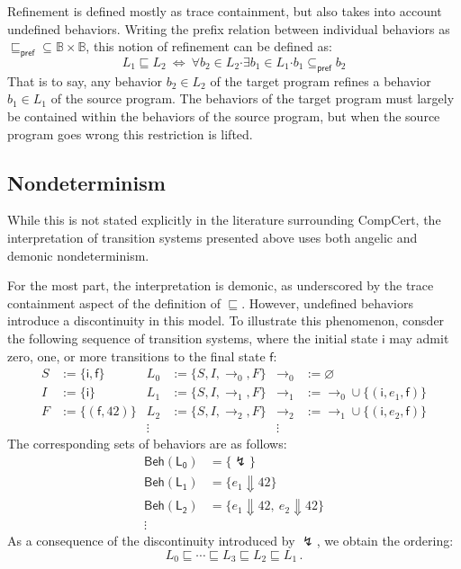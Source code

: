 \documentclass[draft,11pt]{report}
\theoremstyle{definition}
\newcommand{\kw}[1]{\ensuremath{ \mathsf{#1} }}
\newcommand{\bdot}{\boldsymbol{\cdot}}
\newcommand{\refby}{\sqsubseteq} %
\begin{document}
Refinement is defined mostly as trace containment,
but also takes into account undefined behaviors.
Writing the prefix relation between individual behaviors as
${\sqsubseteq_\kw{pref}} \subseteq \mathbb{B} \times \mathbb{B}$,
this notion of refinement can be defined as:
\[
  L_1 \refby L_2
  \: \Leftrightarrow \:
  \forall b_2 \in L_2 \bdot
  \exists b_1 \in L_1 \bdot
  b_1 \subseteq_\kw{pref} b_2
\]
That is to say,
any behavior $b_2 \in L_2$ of the target program
refines a behavior $b_1 \in L_1$ of the source program.
The behaviors of the target program must largely be contained
within the behaviors of the source program,
but when the source program goes wrong
this restriction is lifted.

\subsection{Nondeterminism}

While this is not stated explicitly
in the literature surrounding CompCert,
the interpretation of transition systems presented above
uses both angelic and demonic nondeterminism.

For the most part,
the interpretation is demonic,
as underscored by the trace containment aspect
of the definition of $\refby$.
However,
undefined behaviors introduce a discontinuity in this model.
To illustrate this phenomenon,
consder the following sequence of transition systems,
where the initial state $\kw{i}$ may admit zero, one, or more
transitions to the final state $\kw{f}$:
\begin{align*}
  S &:= \{ \kw{i}, \kw{f} \} &
  L_0 &:= \{ S, I, {\rightarrow_0}, F \} &
  {\rightarrow_0} &:= \varnothing \\
  I &:= \{ \kw{i} \} &
  L_1 &:= \{ S, I, {\rightarrow_1}, F \} &
  {\rightarrow_1} &:= {\rightarrow_0} \cup
    \{ (\kw{i}, e_1, \kw{f}) \} \\
  F &:= \{ (\kw{f}, 42) \} &
  L_2 &:= \{ S, I, {\rightarrow_2}, F \} & 
  {\rightarrow_2} &:= {\rightarrow_1} \cup
    \{ (\kw{i}, e_2, \kw{f}) \} \\
  & & \vdots \: & & \vdots \:\:
\end{align*}
The corresponding sets of behaviors are as follows:
\begin{align*}
  \kw{Beh(L_0)} &= \{ \lightning \} \\
  \kw{Beh(L_1)} &= \{ e_1 \Downarrow 42 \} \\
  \kw{Beh(L_2)} &= \{ e_1 \Downarrow 42, \: e_2 \Downarrow 42 \} \\
  \vdots \quad
\end{align*}
As a consequence of the discontinuity introduced by $\lightning$,
we obtain the ordering:
\[
  L_0 \refby \cdots \refby L_3 \refby L_2 \refby L_1
  \,.
\]
\end{document}
